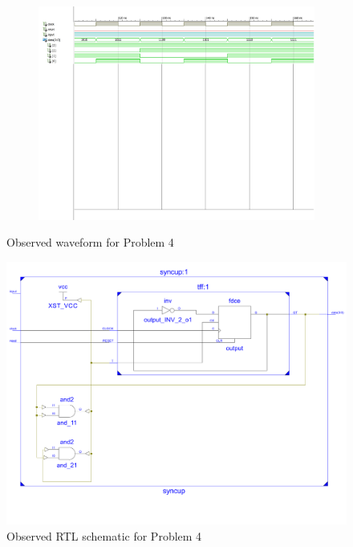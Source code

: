 \documentclass{lab_sheet}
\begin{document}
\begin{figure}[H]
        \begin{subfigure}{\linewidth}
            \includegraphics[width=.95\linewidth, frame]{../Figures/4-3.pdf}
        \caption{}
        \label{fig:obs4-3}
        \end{subfigure}
        \caption{Observed waveform for Problem 4}
        \label{fig:obs4}
    \end{figure}
    \begin{figure}[H]
        \centering
        \includegraphics[scale=0.4]{../Figures/q4_ckt.pdf}
        \caption{Observed RTL schematic for Problem 4}
        \label{fig:rtl4}
    \end{figure}
\end{document}
